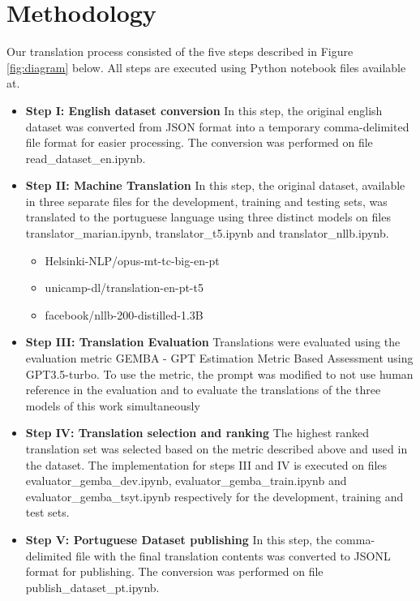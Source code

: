 \documentclass{article}
\begin{document}
\section{Methodology} 

Our translation process consisted of the five steps described in Figure
\ref{fig:diagram} below. All steps are executed using Python notebook files
available at.

\begin{itemize}
    \item \textbf{Step I: English dataset conversion} In this step, the original
    english dataset was converted from JSON format into a temporary 
    comma-delimited file format for easier processing. The conversion was
    performed on file read\_dataset\_en.ipynb.
    \item \textbf{Step II: Machine Translation} In this step, the original
    dataset, available in three separate files for the development, training and
    testing sets, was translated to the portuguese language using three distinct
    models on files translator\_marian.ipynb, translator\_t5.ipynb and translator\_nllb.ipynb.
        \begin{itemize}
            \item Helsinki-NLP/opus-mt-tc-big-en-pt
            \item unicamp-dl/translation-en-pt-t5
            \item facebook/nllb-200-distilled-1.3B
        \end{itemize}
    \item \textbf{Step III: Translation Evaluation} Translations were evaluated
    using the evaluation metric GEMBA - GPT Estimation Metric Based Assessment
    \cite{kocmi2023large} using GPT3.5-turbo. To use the metric, the prompt was
    modified to not use human reference in the evaluation and to evaluate the
    translations of the three models of this work simultaneously 
    \item \textbf{Step IV: Translation selection and ranking} The highest ranked translation set
    was selected based on the metric described above and used in the dataset.
    The implementation for steps III and IV is executed on files
    evaluator\_gemba\_dev.ipynb, evaluator\_gemba\_train.ipynb and
    evaluator\_gemba\_tsyt.ipynb respectively for the development, training and
    test sets.
    \item \textbf{Step V: Portuguese Dataset publishing}  In this step, the
    comma-delimited file with the final translation contents was converted to
    JSONL format for publishing. The conversion was performed on file 
    publish\_dataset\_pt.ipynb.
\end{itemize}
 
\end{document}
